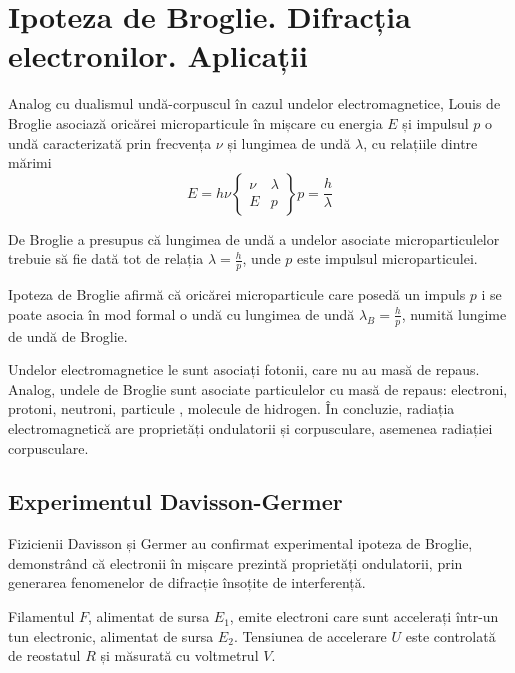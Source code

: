 \section{Ipoteza de Broglie. Difracția electronilor. Aplicații}

Analog cu dualismul undă-corpuscul în cazul undelor electromagnetice, Louis de Broglie asociază oricărei microparticule în mișcare cu energia $E$ și impulsul $p$ o undă caracterizată prin frecvența $\nu$ și lungimea de undă $\lambda$, cu relațiile dintre mărimi
\[
    E = h \nu
    \begin{Bmatrix}
        \nu & \lambda \\
        E   & p
    \end{Bmatrix}
    p = \frac{h}{\lambda}
\]

De Broglie a presupus că lungimea de undă a undelor asociate microparticulelor
trebuie să fie dată tot de relația \( \lambda = \frac{h}{p} \), unde $p$ este
impulsul microparticulei.

\parbreak
Ipoteza de Broglie afirmă că oricărei microparticule care posedă un impuls $p$
i se poate asocia în mod formal o undă cu lungimea de undă
\( \lambda_B = \frac{h}{p} \), numită lungime de undă de Broglie.

Undelor electromagnetice le sunt asociați fotonii, care nu au masă de repaus.
Analog, undele de Broglie sunt asociate particulelor cu masă de repaus:
electroni, protoni, neutroni, particule \alpha, molecule de hidrogen. În
concluzie, radiația electromagnetică are proprietăți ondulatorii și
corpusculare, asemenea radiației corpusculare.

\subsection*{Experimentul Davisson-Germer}

Fizicienii Davisson și Germer au confirmat experimental ipoteza de Broglie,
demonstrând că electronii în mișcare prezintă proprietăți ondulatorii, prin
generarea fenomenelor de difracție însoțite de interferență.

Filamentul $F$, alimentat de sursa $E_1$, emite electroni care sunt accelerați
într-un tun electronic, alimentat de sursa $E_2$. Tensiunea de accelerare $U$
este controlată de reostatul $R$ și măsurată cu voltmetrul $V$.
